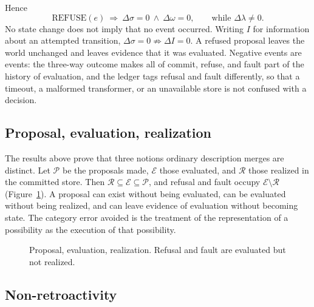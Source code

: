 \documentclass[11pt]{article}
\begin{document}
Hence
\[
\mathrm{REFUSE}(e)\ \Rightarrow\ \Delta\sigma=0\ \land\ \Delta\omega=0,\qquad\text{while }\Delta\lambda\neq 0.
\]
No state change does not imply that no event occurred. Writing $I$ for information about an attempted transition, $\Delta\sigma=0\not\Rightarrow\Delta I=0$. A refused proposal leaves the world unchanged and leaves evidence that it was evaluated. Negative events are events: the three-way outcome makes all of \textsf{commit}, \textsf{refuse}, and \textsf{fault} part of the history of evaluation, and the ledger tags refusal and fault differently, so that a timeout, a malformed transformer, or an unavailable store is not confused with a decision.

\subsection{Proposal, evaluation, realization}

The results above prove that three notions ordinary description merges are distinct. Let $\mathcal P$ be the proposals made, $\mathcal E$ those evaluated, and $\mathcal R$ those realized in the committed store. Then $\mathcal R\subseteq\mathcal E\subseteq\mathcal P$, and refusal and fault occupy $\mathcal E\setminus\mathcal R$ (Figure~\ref{f:pre}). A proposal can exist without being evaluated, can be evaluated without being realized, and can leave evidence of evaluation without becoming state. The category error avoided is the treatment of the representation of a possibility as the execution of that possibility.

\begin{figure}[h]
\centering
{}
\caption{Proposal, evaluation, realization. Refusal and fault are evaluated but not realized.}
\label{f:pre}
\end{figure}

\subsection{Non-retroactivity}
\end{document}
